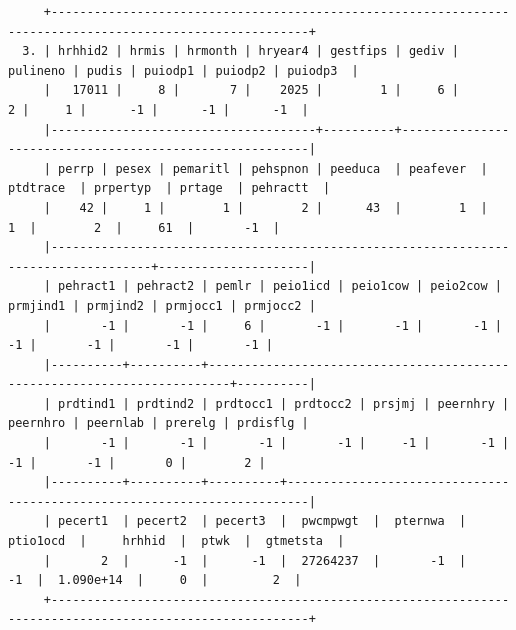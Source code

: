 \documentclass[
]{book}
\begin{document}
\begin{verbatim}
     +----------------------------------------------------------------------------------------------------------+
  3. | hrhhid2 | hrmis | hrmonth | hryear4 | gestfips | gediv | pulineno | pudis | puiodp1 | puiodp2 | puiodp3  |
     |   17011 |     8 |       7 |    2025 |        1 |     6 |        2 |     1 |      -1 |      -1 |      -1  |
     |-------------------------------------+----------+---------------------------------------------------------|
     | perrp | pesex | pemaritl | pehspnon | peeduca  | peafever  | ptdtrace  | prpertyp  | prtage  | pehractt  |
     |    42 |     1 |        1 |        2 |      43  |        1  |        1  |        2  |     61  |       -1  |
     |------------------------------------------------------------------------------------+---------------------|
     | pehract1 | pehract2 | pemlr | peio1icd | peio1cow | peio2cow | prmjind1 | prmjind2 | prmjocc1 | prmjocc2 |
     |       -1 |       -1 |     6 |       -1 |       -1 |       -1 |       -1 |       -1 |       -1 |       -1 |
     |----------+----------+-------------------------------------------------------------------------+----------|
     | prdtind1 | prdtind2 | prdtocc1 | prdtocc2 | prsjmj | peernhry | peernhro | peernlab | prerelg | prdisflg |
     |       -1 |       -1 |       -1 |       -1 |     -1 |       -1 |       -1 |       -1 |       0 |        2 |
     |----------+----------+----------+-------------------------------------------------------------------------|
     | pecert1  | pecert2  | pecert3  |  pwcmpwgt  |  pternwa  |  ptio1ocd  |     hrhhid  |  ptwk  |  gtmetsta  |
     |       2  |      -1  |      -1  |  27264237  |       -1  |        -1  |  1.090e+14  |     0  |         2  |
     +----------------------------------------------------------------------------------------------------------+


\end{verbatim}
\end{document}
